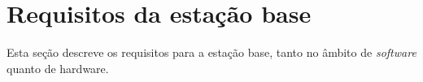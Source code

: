 \section{Requisitos da estação base}

Esta seção descreve os requisitos para a estação base, tanto no âmbito de \textit{software} quanto de hardware.
